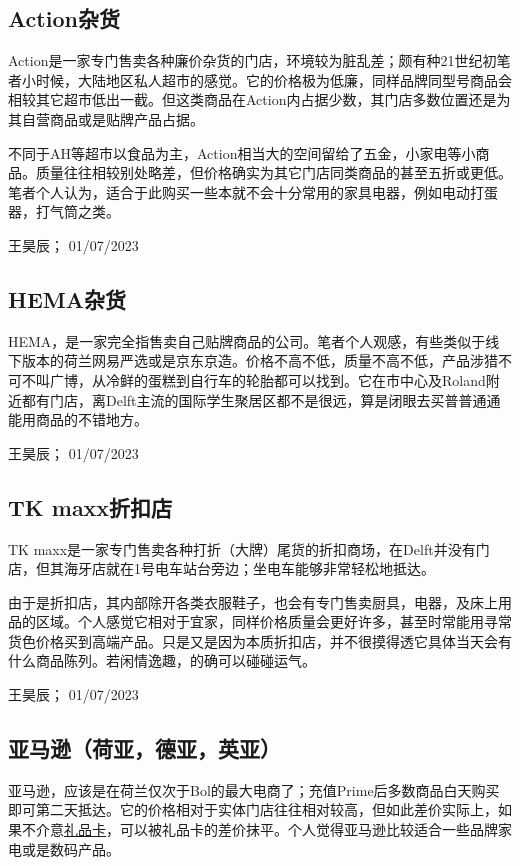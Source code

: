 \subsection{Action杂货}
Action是一家专门售卖各种廉价杂货的门店，环境较为脏乱差；颇有种21世纪初笔者小时候，大陆地区私人超市的感觉。它的价格极为低廉，同样品牌同型号商品会相较其它超市低出一截。但这类商品在Action内占据少数，其门店多数位置还是为其自营商品或是贴牌产品占据。

不同于AH等超市以食品为主，Action相当大的空间留给了五金，小家电等小商品。质量往往相较别处略差，但价格确实为其它门店同类商品的甚至五折或更低。笔者个人认为，适合于此购买一些本就不会十分常用的家具电器，例如电动打蛋器，打气筒之类。
\begin{flushright}
王昊辰； 01/07/2023
\end{flushright}

\subsection{HEMA杂货}
HEMA，是一家完全指售卖自己贴牌商品的公司。笔者个人观感，有些类似于线下版本的荷兰网易严选或是京东京造。价格不高不低，质量不高不低，产品涉猎不可不叫广博，从冷鲜的蛋糕到自行车的轮胎都可以找到。它在市中心及Roland附近都有门店，离Delft主流的国际学生聚居区都不是很远，算是闭眼去买普普通通能用商品的不错地方。
\begin{flushright}
王昊辰； 01/07/2023
\end{flushright}

\subsection{TK maxx折扣店}
TK maxx是一家专门售卖各种打折（大牌）尾货的折扣商场，在Delft并没有门店，但其海牙店就在1号电车站台旁边；坐电车能够非常轻松地抵达。

由于是折扣店，其内部除开各类衣服鞋子，也会有专门售卖厨具，电器，及床上用品的区域。个人感觉它相对于宜家，同样价格质量会更好许多，甚至时常能用寻常货色价格买到高端产品。只是又是因为本质折扣店，并不很摸得透它具体当天会有什么商品陈列。若闲情逸趣，的确可以碰碰运气。
\begin{flushright}
王昊辰； 01/07/2023
\end{flushright}

\subsection{亚马逊（荷亚，德亚，英亚）}
亚马逊，应该是在荷兰仅次于Bol的最大电商了；充值Prime后多数商品白天购买即可第二天抵达。它的价格相对于实体门店往往相对较高，但如此差价实际上，如果不介意\hyperlink{礼品卡}{\uline{礼品卡}}，可以被礼品卡的差价抹平。个人觉得亚马逊比较适合一些品牌家电或是数码产品。

